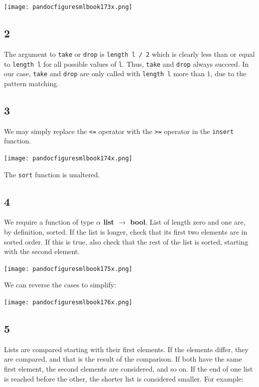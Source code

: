 \documentclass[]{book}
\begin{document}
\medskip
\begin{center}
\noindent\texttt{[image: pandocfiguresmlbook173x.png]}
\end{center}
\medskip

\subsection*{2}
The argument to \texttt{take} or \texttt{drop} is \texttt{length l / 2} which is clearly less than or equal to \texttt{length l} for all possible values of \texttt{l}. Thus, \texttt{take} and \texttt{drop} always succeed. In our case, \texttt{take} and \texttt{drop} are only called with \texttt{length l} more than 1, due to the pattern matching.
 
\subsection*{3}
We may simply replace the \texttt{<=} operator with the \texttt{>=} operator in the \texttt{insert} function.

\medskip
\begin{center}
\noindent\texttt{[image: pandocfiguresmlbook174x.png]}
\end{center}
\medskip

\noindent The \texttt{sort} function is unaltered.

\subsection*{4}

We require a function of type \textbf{\textsf{$\alpha$ list $\rightarrow$ bool}}. List of length zero and one are, by definition, sorted. If the list is longer, check that its first two elements are in sorted order. If this is true, also check that the rest of the list is sorted, starting with the second element.

\medskip
\begin{center}
\noindent\texttt{[image: pandocfiguresmlbook175x.png]}
\end{center}
\medskip

\noindent We can reverse the cases to simplify:

\medskip
\begin{center}
\noindent\texttt{[image: pandocfiguresmlbook176x.png]}
\end{center}
\medskip

\subsection*{5}
Lists are compared starting with their first elements. If the elements differ, they are compared, and that is the result of the comparison. If both have the same first element, the second elements are considered, and so on. If the end of one list is reached before the other, the shorter list is considered smaller. For example:
\end{document}
